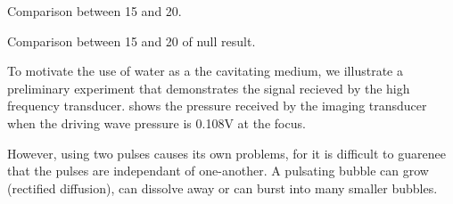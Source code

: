 \clearpage

Comparison between 15 and 20.

Comparison between 15 and 20 of null result.



To motivate the use of water as a the cavitating medium, 
we illustrate a preliminary experiment that demonstrates the signal recieved by the high frequency transducer.
 shows the pressure received by the imaging transducer when the driving wave pressure is 0.108V at the focus.

However, using two pulses causes its own problems,
for it is difficult to guarenee that the pulses are independant of one-another.
A pulsating bubble can grow (rectified diffusion),
can dissolve away or can burst into many smaller bubbles. 






